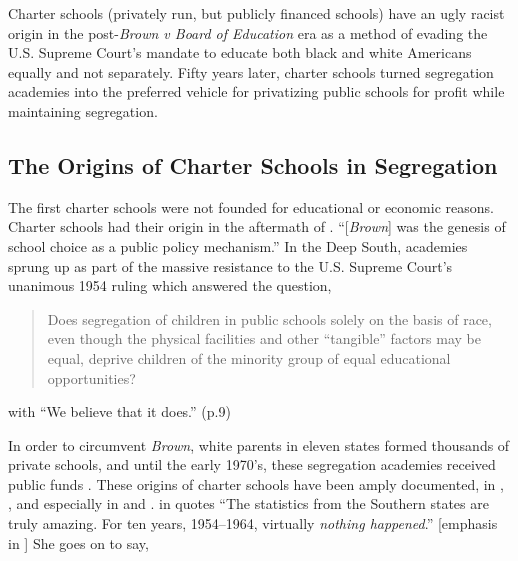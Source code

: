 Charter schools (privately run, but publicly financed schools) have an ugly racist origin in the post-\textit{Brown v Board of Education} era as a method of evading the U.S. Supreme Court's mandate to educate both black and white Americans equally and not separately. Fifty years later, charter schools turned segregation academies into the preferred vehicle for privatizing public schools for profit while maintaining segregation.

\subsection{The Origins of Charter Schools in Segregation}\label{sec:origins}\indent

The first charter schools were not founded for educational or economic reasons. Charter schools had their origin in the aftermath of \textit{}. ``[\textit{Brown}] was the genesis of school choice as a public policy mechanism.'' \parencite[8]{Garcia2018} In the Deep South, academies sprung up as part of the massive resistance to the U.S. Supreme Court's unanimous 1954 ruling which answered the question, %

\begin{quote}\OnehalfSpacing%
Does segregation of children in public schools solely on the basis of race, even though the physical facilities and other ``tangible'' factors may be equal, deprive children of the minority group of equal educational opportunities? 
\end{quote}

\noindent{} with ``We believe that it does.'' (p.9) %
  
In order to circumvent \textit{Brown}, white parents in eleven states formed thousands of private schools, and until the early 1970's, these segregation academies received public funds \parencite%
  {Rooks2017}. These origins of  charter schools have been amply documented, in \textcite{Frankenberg.etal2010}, \textcite{Frankenberg.etal2011}, and especially in \textcite{Suitts2019} and \textcite{Suitts2020}. \citeauthor{Alexander2011} in  quotes \textcite[52]{Rosenberg1991} ``The statistics from the Southern states are truly amazing. For ten years, 1954–1964, virtually \textit{nothing happened}.'' [emphasis in \parencite[223]{Alexander2011}] She goes on to say, %

